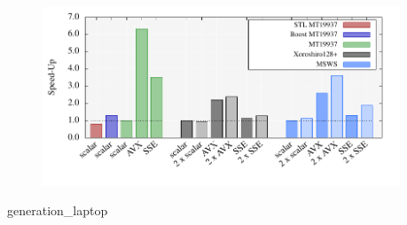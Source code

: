 \documentclass{stdlocal}
\begin{document}
    \begin{figure}
      \center
      \includegraphics[width=0.95\textwidth]{plots/generation_laptop_speedup.pdf}
      \caption{}
    \end{figure}

    \begin{table}
      \caption{}
      \footnotesize
      \renewcommand{\arraystretch}{1.2}
      {generation_laptop}
    \end{table}
\end{document}
